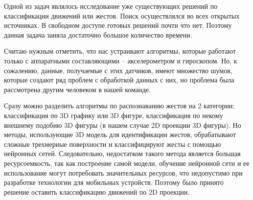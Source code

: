 Одной из задач являлось исследование уже существующих решений по классификации движений или жестов. Поиск осуществлялся во всех открытых источниках. В свободном доступе готовых решений почти что нет. Поэтому данная задача заняла достаточно большое количество времени.

Считаю нужным отметить, что нас устраивают алгоритмы, которые работают только с аппаратными составляющими – акселерометром и гироскопом. Но, к сожалению, данные, получаемые с этих датчиков, имеют множество шумов, которые создают ряд проблем с обработкой данных с них, но проблема была рассмотрена другим человеком в нашей команде.

Сразу можно разделить алгоритмы по распознаванию жестов на 2 категории: классификация по 3D графику или 3D фигуре, классификация по некому внешнему подобию 3D фигуры (в нашем случае 2D проекции 3D фигуры).
Но методы, использующие 3D модель для идентификации жестов, обрабатывают сложные трехмерные поверхности и классифицируют жесты с помощью нейронных сетей. Следовательно, недостатком такого метода является большая ресурсоемкость, так как построение самой модели, обучение нейронной сети и ее использование могут потребовать значительных ресурсов, что недопустимо при разработке технологии для мобильных устройств. Поэтому было принято решение оставить классификацию движений по 2D проекции.